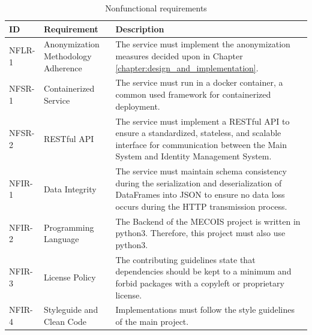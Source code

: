  \begin{table}[ht]
 	\caption{Nonfunctional requirements}
 	\label{tab:nonfunctional_requirements}
 	\begin{tabular}{|p{1.5cm}|p{4cm}|p{8cm}|}
 		\hline
 		ID & Requirement & Description \\
 		\hline
 		NFLR-1 & Anonymization Methodology Adherence & 
 		The service must implement the anonymization measures decided upon in Chapter \ref{chapter:design_and_implementation}.  \\
 		\hline
 		NFSR-1 & Containerized Service & 
 		The service must run in a docker container, a common used framework for containerized deployment. \autocite[9--11]{jangla2018accelerating} \\
 		\hline
 		NFSR-2 & RESTful \ac{API} &
 		The service must implement a RESTful \ac{API} to ensure a standardized, stateless, and scalable interface for communication between the Main System and Identity Management System. \\
 		\hline
 		NFIR-1 & Data Integrity & 
 		The service must maintain schema consistency during the serialization and deserialization of DataFrames into \ac{JSON} to ensure no data loss occurs during the \ac{HTTP} transmission process. \\
 		\hline		
 		NFIR-2 & Programming Language & 
 		The Backend of the MECOIS project is written in python3. Therefore, this project must  also use python3. \autocite{github_mecois} \\
 		\hline
 		NFIR-3 & License Policy & 
 		The contributing guidelines state that dependencies should be kept to a minimum and forbid packages with a copyleft or proprietary license.  \autocite{github_mecois} \\
 		\hline
 		NFIR-4 & Styleguide and Clean Code & 
 		Implementations must follow the style guidelines of the main project. \autocite{github_mecois} \\
 		\hline
 	\end{tabular}
 \end{table}